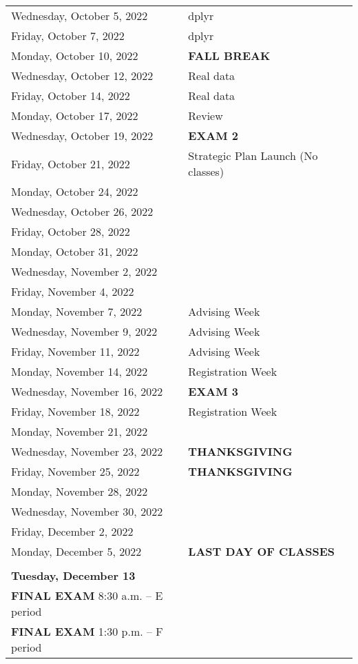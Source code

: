 \documentclass[
]{book}
\begin{document}
\begin{longtable}[]{@{}
  >{\raggedright\arraybackslash}p{}
  >{\raggedright\arraybackslash}p{}@{}}
Wednesday, October 5, 2022 & dplyr \\
Friday, October 7, 2022 & dplyr \\
Monday, October 10, 2022 & \textbf{FALL BREAK} \\
Wednesday, October 12, 2022 & Real data \\
Friday, October 14, 2022 & Real data \\
Monday, October 17, 2022 & Review \\
Wednesday, October 19, 2022 & \textbf{EXAM 2} \\
Friday, October 21, 2022 & Strategic Plan Launch (No classes) \\
Monday, October 24, 2022 & \\
Wednesday, October 26, 2022 & \\
Friday, October 28, 2022 & \\
Monday, October 31, 2022 & \\
Wednesday, November 2, 2022 & \\
Friday, November 4, 2022 & \\
Monday, November 7, 2022 & Advising Week \\
Wednesday, November 9, 2022 & Advising Week \\
Friday, November 11, 2022 & Advising Week \\
Monday, November 14, 2022 & Registration Week \\
Wednesday, November 16, 2022 & \textbf{EXAM 3} \\
Friday, November 18, 2022 & Registration Week \\
Monday, November 21, 2022 & \\
Wednesday, November 23, 2022 & \textbf{THANKSGIVING} \\
Friday, November 25, 2022 & \textbf{THANKSGIVING} \\
Monday, November 28, 2022 & \\
Wednesday, November 30, 2022 & \\
Friday, December 2, 2022 & \\
Monday, December 5, 2022 & \textbf{LAST DAY OF CLASSES} \\
& \\
\textbf{Tuesday, December 13} & \\
\textbf{FINAL EXAM} 8:30 a.m. -- E period & \\
\textbf{FINAL EXAM} 1:30 p.m. -- F period & \\
\bottomrule
\end{longtable}
\end{document}
